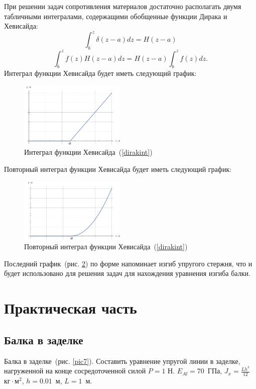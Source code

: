 \documentclass[12pt, a4paper]{article}
\begin{document}
При решении задач сопротивления материалов достаточно располагать двумя табличными интегралами, содержащими обобщенные функции
Дирака и Хевисайда:
\begin{equation}
	\label{dirakint}
	\int_{b}^z \delta (z - a) dz = 
	H(z - a)
\end{equation}
\begin{equation}
	\label{heaviint}
	\int_b^z f(z) H(z - a) d z = H(z - a)\int_b^z f(z) d z.
\end{equation}
\newpage
Интеграл функции Хевисайда будет иметь следующий график:
\begin{figure}[!h]
	\centering
	\includegraphics[width=0.45\textwidth]{intHeav}%
	\caption{Интеграл функции Хевисайда~(\ref{dirakint})}
	\vspace*{-2mm}
	\label{intHeav}
\end{figure}
\newline
Повторный интеграл функции Хевисайда будет иметь следующий график:
\begin{figure}[!h]
	\centering
	\includegraphics[width=0.45\textwidth]{int2Heav}%
	\caption{Повторный интеграл функции Хевисайда~(\ref{dirakint})}
	\vspace*{-2mm}
	\label{int2Heav}
\end{figure}
\newline
Последний график~(рис. \ref{int2Heav}) по форме напоминает изгиб упругого стержня, что и будет использовано для решения задач для нахождения уравнения изгиба балки.

\section{Практическая часть}
\subsection{Балка в заделке}
Балка в заделке~(рис. \ref{pic7}). Составить уравнение упругой линии в заделке, нагруженной на конце сосредоточенной силой $P = 1$ Н. 
$E_{Al} = 70$~ГПа, $ J_{x} = \frac{L h^3}{12}$~$\mbox{кг} \cdot \mbox{м}^2$, $h = 0.01$~м, $L = 1$~м.
\end{document}

